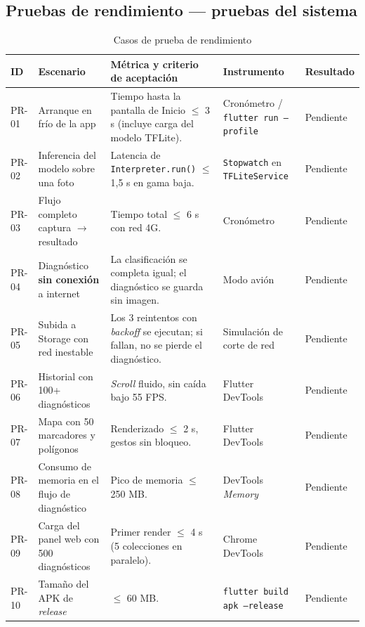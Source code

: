 \documentclass[12pt,a4paper]{article}
\begin{document}
\subsection{Pruebas de rendimiento --- pruebas del sistema}

\begin{table}[H]
\centering
\caption{Casos de prueba de rendimiento}
\label{tab:pr}
\renewcommand{\arraystretch}{1.3}
\small
\begin{tabular}{p{1.1cm} p{4.2cm} p{4.4cm} p{2.0cm} p{1.5cm}}
\toprule
\bfseries ID & \bfseries Escenario & \bfseries Métrica y criterio de aceptación & \bfseries Instrumento & \bfseries Resultado \\
\midrule
PR-01 & Arranque en frío de la app & Tiempo hasta la pantalla de Inicio $\leq$ 3 s (incluye carga del modelo TFLite). & Cronómetro / \texttt{flutter run --profile} & Pendiente \\
PR-02 & Inferencia del modelo sobre una foto & Latencia de \texttt{Interpreter.run()} $\leq$ 1{,}5 s en gama baja. & \texttt{Stopwatch} en \texttt{TFLiteService} & Pendiente \\
PR-03 & Flujo completo captura $\rightarrow$ resultado & Tiempo total $\leq$ 6 s con red 4G. & Cronómetro & Pendiente \\
PR-04 & Diagnóstico \textbf{sin conexión} a internet & La clasificación se completa igual; el diagnóstico se guarda sin imagen. & Modo avión & Pendiente \\
PR-05 & Subida a Storage con red inestable & Los 3 reintentos con \textit{backoff} se ejecutan; si fallan, no se pierde el diagnóstico. & Simulación de corte de red & Pendiente \\
PR-06 & Historial con 100+ diagnósticos & \textit{Scroll} fluido, sin caída bajo 55 FPS. & Flutter DevTools & Pendiente \\
PR-07 & Mapa con 50 marcadores y polígonos & Renderizado $\leq$ 2 s, gestos sin bloqueo. & Flutter DevTools & Pendiente \\
PR-08 & Consumo de memoria en el flujo de diagnóstico & Pico de memoria $\leq$ 250 MB. & DevTools \textit{Memory} & Pendiente \\
PR-09 & Carga del panel web con 500 diagnósticos & Primer render $\leq$ 4 s (5 colecciones en paralelo). & Chrome DevTools & Pendiente \\
PR-10 & Tamaño del APK de \textit{release} & $\leq$ 60 MB. & \texttt{flutter build apk --release} & Pendiente \\
\bottomrule
\end{tabular}
\end{table}
\end{document}
